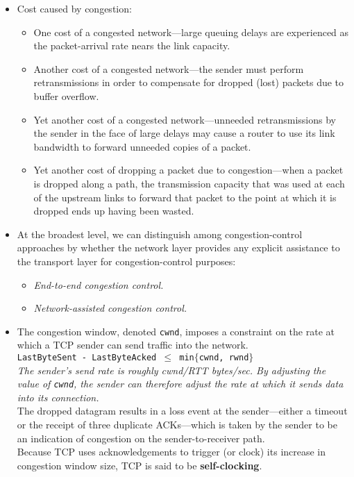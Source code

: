 \begin{itemize}
\item
Cost caused by congestion:
\begin{itemize}
\item One cost of a congested network---large queuing delays are experienced as the packet-arrival rate nears the link capacity.
\item Another cost of a congested network---the sender must perform retransmissions in order to compensate for dropped (lost) packets due to buffer overflow.
\item Yet another cost of a congested network---unneeded retransmissions by the sender in the face of large delays may cause a router to use its link bandwidth to forward unneeded copies of a packet.
\item Yet another cost of dropping a packet due to congestion---when a packet is dropped along a path, the transmission capacity that was used at each of the upstream links to forward that packet to the point at which it is dropped ends up having been wasted.
\end{itemize}

\item
At the broadest level, we can distinguish among congestion-control approaches by whether the network layer provides any explicit assistance to the transport layer for congestion-control purposes:
\begin{itemize}
\item \textit{End-to-end congestion control.}
\item \textit{Network-assisted congestion control.}
\end{itemize}

\item
The congestion window, denoted \texttt{cwnd}, imposes a constraint on the rate at which a TCP sender can send traffic into the network.\\
\hspace*{1em}\texttt{LastByteSent - LastByteAcked $\leq$ min$\{$cwnd, rwnd$\}$}\\
\textit{The sender's send rate is roughly cwnd/RTT bytes/sec. By adjusting the value of \texttt{cwnd}, the sender can therefore adjust the rate at which it sends data into its connection.}\\
The dropped datagram results in a loss event at the sender---either a timeout or the receipt of three duplicate ACKs---which is taken by the sender to be an indication of congestion on the sender-to-receiver path.\\
Because TCP uses acknowledgements to trigger (or clock) its increase in congestion window size, TCP is said to be \textbf{self-clocking}.


\end{itemize}
